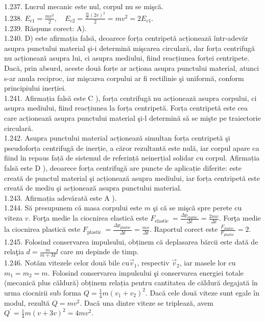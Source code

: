 1.237. Lucrul mecanic este nul, corpul nu se mişcă.\\
1.238. $E_{c 1}=\frac{m v^{2}}{2}, \quad E_{c 2}=\frac{\frac{m}{2}(2 v)^{2}}{2}=m v^{2}=2 E_{c 1}$.\\
1.239. Răspuns corect: A).\\
1.240. D) este afirmația falsă, deoarece forța centripetă acționează într-adevăr asupra punctului material şi-i determină mişcarea circulară, dar forța centrifugă nu acționează asupra lui, ci asupra mediului, fiind reacțiunea forței centripete. Dacă, prin absurd, aceste două forțe ar acționa asupra punctului material, atunci s-ar anula reciproc, iar mişcarea corpului ar fi rectilinie şi uniformă, conform principiului inerției.\\
1.241. Afirmația falsă este C ), forța centrifugă nu acționează asupra corpului, ci asupra mediului, fiind reacțiunea la forța centripetă. Forța centripetă este cea care acționează asupra punctului material şi-l determină să se mişte pe traiectorie circulară.\\
1.242. Asupra punctului material acționează simultan forța centripetă şi pseudoforța centrifugă de inerție, a căror rezultantă este nulă, iar corpul apare ca fiind în repaus față de sistemul de referință neinerțial solidar cu corpul. Afirmația falsă este D ), deoarece forța centrifugă are puncte de aplicație diferite: este creată de punctul material şi acționează asupra mediului, iar forța centripetă este creată de mediu şi acționează asupra punctului material.\\
1.243. Afirmația adevărată este A ).\\
1.244. Să presupunem că masa corpului este $m$ şi că se mişcă spre perete cu viteza $v$. Forţa medie la ciocnirea elastică este $F_{\text {elastic }}=\frac{\Delta p_{\text {elastic }}}{\Delta t}=\frac{2 m v}{\Delta t}$. Forţa medie la ciocnirea plastică este $F_{\text {plastic }}=\frac{\Delta p_{\text {plastic }}}{\Delta t}=\frac{m v}{\Delta t}$. Raportul corect este $\frac{F_{\text {elastic }}}{F_{\text {plastic }}}=2$.\\
1.245. Folosind conservarea impulsului, obținem că deplasarea bărcii este dată de relaţia $d=\frac{m}{m+M} l$ care nu depinde de timp.\\
1.246. Notăm vitezele celor două bile $\mathrm{cu} \vec{v}_{1}$, respectiv $\vec{v}_{2}$, iar masele lor cu $m_{1}=m_{2}=m$. Folosind conservarea impulsului şi conservarea energiei totale (mecanică plus căldură) obținem relația pentru cantitatea de căldură degajată în urma ciocnirii sub forma $Q=\frac{1}{4} m\left(v_{1}+v_{2}\right)^{2}$. Dacă cele două viteze sunt egale în modul, rezultă $Q=m v^{2}$. Dacă una dintre viteze se triplează, avem $Q^{\prime}=\frac{1}{4} m(v+3 v)^{2}=4 m v^{2}$.\\
